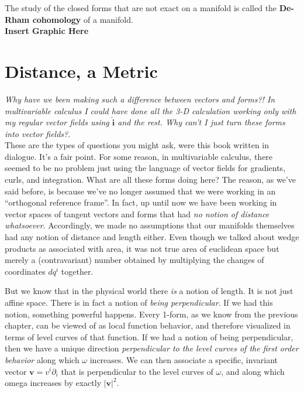 	The study of the closed forms that are not exact on a manifold is called the \textbf{De-Rham cohomology} of a manifold. \\
	
	\textbf{Insert Graphic Here}
	
	
	\section{Distance, a Metric}	
	
	
	
	\emph{Why have we been making such a difference between vectors and forms?! In multivariable calculus I could have done all the 3-D calculation working only with my regular vector fields using $\hat{\mathbf{i}}$ and the rest. Why can't I just turn these forms into vector fields?}.\\
	
	These are the types of questions you might ask, were this book written in dialogue. It's a fair point. For some reason, in multivariable calculus, there seemed to be no problem just using the language of vector fields for gradients, curls, and integration. What are all these forms doing here? The reason, as we've said before, is because we've no longer assumed that we were working in an ``orthogonal reference frame''. In fact, up until now we have been working in vector spaces of tangent vectors and forms that had \emph{no notion of distance whatsoever}. Accordingly, we made no assumptions that our manifolds themselves had any notion of distance and length either. Even though we talked about wedge products as associated with area, it was not true area of euclidean space but merely a (contravariant) number obtained by multiplying the changes of coordinates $dq^i$ together. 
	
	
	But we know that in the physical world there \emph{is} a notion of length. It is not just affine space. There is in fact a notion of \emph{being perpendicular}. If we had this notion, something powerful happens. Every 1-form, as we know from the previous chapter, can be viewed of as local function behavior, and therefore visualized in terms of level curves of that function. If we had a notion of being perpendicular, then we have a unique direction \emph{perpendicular to the level curves of the first order behavior} along which $\omega$ increases. We can then associate a specific, invariant vector $\mathbf v = v^i \partial_i$ that is perpendicular to the level curves of $\omega$, and along which omega increases by exactly $|\mathbf v|^2$. 
	
